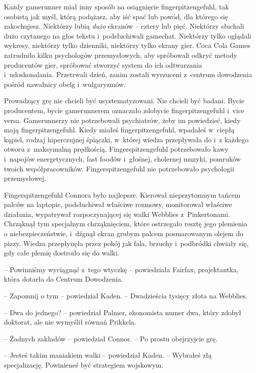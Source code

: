 \documentclass[oneside,polish,11pt,rmheadings]{mwbk}
\begin{document}
Każdy gamerunner miał inny sposób na osiągnięcie fingerpitzengefuhl, tak osobistą jak myśl, którą podążasz, aby iść spać lub powód, dla którego się zakochujesz. Niektórzy lubią \textit{dużo }ekranów -- cztery lub pięć. Niektórzy słuchali dużo czytanego na głos tekstu i~podsłuchiwali gamechat. Niektórzy tylko oglądali wykresy, niektórzy tylko dzienniki, niektórzy tylko ekrany gier. Coca Cola Games zatrudniło kilku psychologów przemysłowych, aby spróbowali odkryć metody producentów gier, spróbować stworzyć system do ich odtwarzania i~udoskonalania. Przetrwali dzień, zanim zostali wyrzuceni z~centrum dowodzenia pośród nawałnicy obelg i~wulgaryzmów.

Prowadzący grę nie chcieli być usystematyzowani. Nie chcieli być badani. Bycie producentem, bycie gamerunnerem oznaczało zdobycie fingerpitzengefuhl i~vice versa. Gamerunnerzy nie potrzebowali psychiatrów, żeby im powiedzieć, kiedy mają fingerpitzengefuhl. Kiedy miałeś fingerpitzengefuhl, wpadałeś w~ciepłą kąpiel, rodzaj hiperczujnej śpiączki, w~której wiedza przepływała do i~z każdego otworu z~maksymalną prędkością. Fingerspitzengefuhl potrzebowało kawy i~napojów energetycznych, fast foodów i~głośnej, cholernej muzyki, pomruków twoich współpracowników. Fingerspitzengefuhl nie potrzebowało psychologii przemysłowej.

Fingerspitzengefuhl Connora było najlepsze. Kierował nieprzytomnym tańcem palców na laptopie, podsłuchiwał właściwe rozmowy, monitorował właściwe działania, wypatrywał rozpoczynającej się walki Webblies z~Pinkertonami. Chrząknął tym specjalnym chrząknięciem, które ostrzegało resztę jego plemienia o niebezpieczeństwie, i~dźgnął ekran grubym palcem posmarowanym olejem do pizzy. Wiedza przepłynęła przez pokój jak fala, brzuchy i~podbródki chwiały się, gdy całe plemię dostroiło się do walki.

-- Powinniśmy wyciągnąć z~tego wtyczkę -- powiedziała Fairfax, projektantka, która dotarła do Centrum Dowodzenia.

-- Zapomnij o tym -- powiedział Kaden. -- Dwadzieścia tysięcy złota na Webblies.

-- Dwa do jednego? -- powiedział Palmer, ekonomista numer dwa, który zdobył doktorat, ale nie wymyślił równań Prikkela.

-- Żadnych zakładów -- powiedział Connor. -- Po prostu obejrzyjcie grę. 

-- Jesteś takim maniakiem walki -- powiedział Kaden. -- Wybrałeś złą specjalizację. Powinieneś być strategiem wojskowym.
\end{document}
